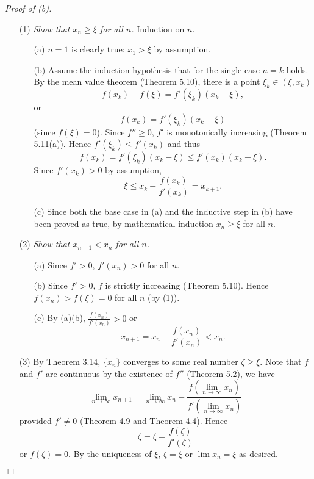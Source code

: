 \documentclass{article}
\begin{document}
\emph{Proof of (b).}
\begin{enumerate}
\item[(1)]
\emph{Show that $x_n \geq \xi$ for all $n$.}
Induction on $n$.
  \begin{enumerate}
  \item[(a)]
  $n = 1$ is clearly true: $x_1 > \xi$ by assumption.

  \item[(b)]
  Assume the induction hypothesis that for the single case $n = k$ holds.
  By the mean value theorem (Theorem 5.10),
  there is a point $\xi_k \in (\xi, x_k)$
  \[
    f(x_k) - f(\xi) = f'(\xi_k)(x_k - \xi),
  \]
  or
  \[
    f(x_k) = f'(\xi_k)(x_k - \xi)
  \]
  (since $f(\xi) = 0$).
  Since $f'' \geq 0$, $f'$ is monotonically increasing (Theorem 5.11(a)).
  Hence $f'(\xi_k) \leq f'(x_k)$ and thus
  \[
    f(x_k)
    = f'(\xi_k)(x_k - \xi)
    \leq f'(x_k)(x_k - \xi).
  \]
  Since $f'(x_k) > 0$ by assumption,
  \[
    \xi \leq x_k - \frac{f(x_k)}{f'(x_k)} = x_{k+1}.
  \]

  \item[(c)]
  Since both the base case in (a) and
  the inductive step in (b) have been proved as true,
  by mathematical induction $x_n \geq \xi$ for all $n$.
  \end{enumerate}

\item[(2)]
\emph{Show that $x_{n+1} < x_n$ for all $n$.}
  \begin{enumerate}
  \item[(a)]
  Since $f' > 0$, $f'(x_n) > 0$ for all $n$.

  \item[(b)]
  Since $f' > 0$, $f$ is strictly increasing (Theorem 5.10).
  Hence $f(x_n) > f(\xi) = 0$ for all $n$ (by (1)).

  \item[(c)]
  By (a)(b), $\frac{f(x_n)}{f'(x_n)} > 0$ or
  \[
    x_{n+1} = x_n - \frac{f(x_n)}{f'(x_n)} < x_n.
  \]
  \end{enumerate}

\item[(3)]
By Theorem 3.14, $\{x_n\}$ converges to some real number $\zeta \geq \xi$.
Note that $f$ and $f'$ are continuous by the existence of $f''$ (Theorem 5.2),
we have
\[
  \lim_{n \to \infty} x_{n+1}
  = \lim_{n \to \infty} x_n - \frac{f(\lim_{n \to \infty} x_n)}{f'(\lim_{n \to \infty} x_n)}
\]
provided $f' \neq 0$ (Theorem 4.9 and Theorem 4.4).
Hence
\[
  \zeta = \zeta - \frac{f(\zeta)}{f'(\zeta)}
\]
or $f(\zeta) = 0$.
By the uniqueness of $\xi$, $\zeta = \xi$ or $\lim x_n = \xi$ as desired.
\end{enumerate}
$\Box$ \\
\end{document}

